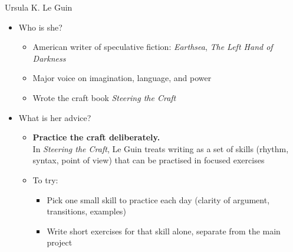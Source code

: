 \documentclass[aspectratio=169]{beamer}
\begin{document}
\begin{frame}{Ursula K. Le Guin}
  \begin{itemize}
  \item Who is she?
    \begin{itemize}
    \item American writer of speculative fiction: \emph{Earthsea}, \emph{The Left Hand of Darkness}
    \item Major voice on imagination, language, and power
    \item Wrote the craft book \emph{Steering the Craft} \citep{leguin:steering}
  \end{itemize}
\item What is her advice?
  \begin{itemize}
    \item \textbf{Practice the craft deliberately.}\\
      In \emph{Steering the Craft}, Le Guin treats writing as a set of skills (rhythm, syntax, point of view) that can be practised in focused exercises \citep{leguin:steering}
    \item To try:
      \begin{itemize}
        \item Pick one small skill to practice each day (clarity of argument, transitions, examples)
        \item Write short exercises for that skill alone, separate from the main project
      \end{itemize}
    \end{itemize}
  \end{itemize}
\end{frame}
\end{document}
